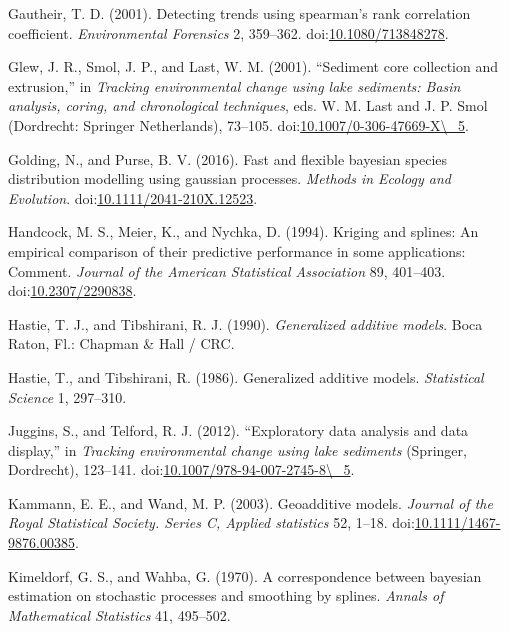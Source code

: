 \documentclass[12pt,]{article}
\begin{document}
\hypertarget{ref-Gautheir2001-ee}{}
Gautheir, T. D. (2001). Detecting trends using spearman's rank
correlation coefficient. \emph{Environmental Forensics} 2, 359--362.
doi:\href{https://doi.org/10.1080/713848278}{10.1080/713848278}.

\hypertarget{ref-Glew2001-co}{}
Glew, J. R., Smol, J. P., and Last, W. M. (2001). ``Sediment core
collection and extrusion,'' in \emph{Tracking environmental change using
lake sediments: Basin analysis, coring, and chronological techniques},
eds. W. M. Last and J. P. Smol (Dordrecht: Springer Netherlands),
73--105.
doi:\href{https://doi.org/10.1007/0-306-47669-X/_5}{10.1007/0-306-47669-X\textbackslash{}\_5}.

\hypertarget{ref-Golding2016-bb}{}
Golding, N., and Purse, B. V. (2016). Fast and flexible bayesian species
distribution modelling using gaussian processes. \emph{Methods in
Ecology and Evolution}.
doi:\href{https://doi.org/10.1111/2041-210X.12523}{10.1111/2041-210X.12523}.

\hypertarget{ref-Handcock1994-lj}{}
Handcock, M. S., Meier, K., and Nychka, D. (1994). Kriging and splines:
An empirical comparison of their predictive performance in some
applications: Comment. \emph{Journal of the American Statistical
Association} 89, 401--403.
doi:\href{https://doi.org/10.2307/2290838}{10.2307/2290838}.

\hypertarget{ref-Hastie1990-bx}{}
Hastie, T. J., and Tibshirani, R. J. (1990). \emph{Generalized additive
models}. Boca Raton, Fl.: Chapman \& Hall / CRC.

\hypertarget{ref-Hastie1986-xs}{}
Hastie, T., and Tibshirani, R. (1986). Generalized additive models.
\emph{Statistical Science} 1, 297--310.

\hypertarget{ref-Juggins2012-uu}{}
Juggins, S., and Telford, R. J. (2012). ``Exploratory data analysis and
data display,'' in \emph{Tracking environmental change using lake
sediments} (Springer, Dordrecht), 123--141.
doi:\href{https://doi.org/10.1007/978-94-007-2745-8/_5}{10.1007/978-94-007-2745-8\textbackslash{}\_5}.

\hypertarget{ref-Kammann2003-pi}{}
Kammann, E. E., and Wand, M. P. (2003). Geoadditive models.
\emph{Journal of the Royal Statistical Society. Series C, Applied
statistics} 52, 1--18.
doi:\href{https://doi.org/10.1111/1467-9876.00385}{10.1111/1467-9876.00385}.

\hypertarget{ref-Kimeldorf1970-cn}{}
Kimeldorf, G. S., and Wahba, G. (1970). A correspondence between
bayesian estimation on stochastic processes and smoothing by splines.
\emph{Annals of Mathematical Statistics} 41, 495--502.
\end{document}

